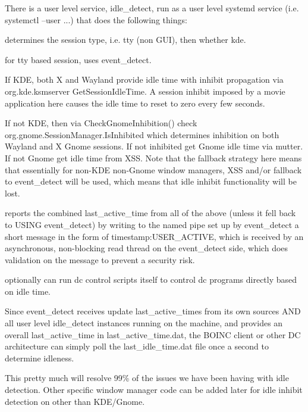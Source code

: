 \begin{DoxyEnumerate}
\item There is a user level service, idle\+\_\+detect, run as a user level systemd service (i.\+e. systemctl --user ...) that does the following things\+:
\begin{DoxyItemize}
\item determines the session type, i.\+e. tty (non G\+UI), then whether kde.
\item for tty based session, uses event\+\_\+detect.
\item If K\+DE, both X and Wayland provide idle time with inhibit propagation via org.\+kde.\+ksmserver Get\+Session\+Idle\+Time. A session inhibit imposed by a movie application here causes the idle time to reset to zero every few seconds.
\item If not K\+DE, then via Check\+Gnome\+Inhibition() check org.\+gnome.\+Session\+Manager.\+Is\+Inhibited which determines inhibition on both Wayland and X Gnome sessions. If not inhibited get Gnome idle time via mutter. If not Gnome get idle time from X\+SS. Note that the fallback strategy here means that essentially for non-\/\+K\+DE non-\/\+Gnome window managers, X\+SS and/or fallback to event\+\_\+detect will be used, which means that idle inhibit functionality will be lost.
\item reports the combined last\+\_\+active\+\_\+time from all of the above (unless it fell back to U\+S\+I\+NG event\+\_\+detect) by writing to the named pipe set up by event\+\_\+detect a short message in the form of timestamp\+:U\+S\+E\+R\+\_\+\+A\+C\+T\+I\+VE, which is received by an asynchronous, non-\/blocking read thread on the event\+\_\+detect side, which does validation on the message to prevent a security risk.
\item optionally can run dc control scripts itself to control dc programs directly based on idle time.
\end{DoxyItemize}
\end{DoxyEnumerate}

Since event\+\_\+detect receives update last\+\_\+active\+\_\+times from its own sources A\+ND all user level idle\+\_\+detect instances running on the machine, and provides an overall last\+\_\+active\+\_\+time in last\+\_\+active\+\_\+time.\+dat, the B\+O\+I\+NC client or other DC architecture can simply poll the last\+\_\+idle\+\_\+time.\+dat file once a second to determine idleness.

This pretty much will resolve 99\% of the issues we have been having with idle detection. Other specific window manager code can be added later for idle inhibit detection on other than K\+D\+E/\+Gnome.

